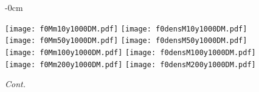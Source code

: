 \documentclass[universe,article,accept,moreauthors,pdftex]{Definitions/mdpi}
\begin{document}
\begin{figure}[H]\ContinuedFloat


\begin{adjustwidth}{-\extralength}{0cm}
\centering %

{\texttt{[image: f0Mm10y1000DM.pdf]}\vspace{3pt}
	  \texttt{[image: f0densM10y1000DM.pdf]}}\\\vspace{5pt}
{\texttt{[image: f0Mm50y1000DM.pdf]}\vspace{3pt}
	  \texttt{[image: f0densM50y1000DM.pdf]}}\\\vspace{5pt}
{\texttt{[image: f0Mm100y1000DM.pdf]}\vspace{3pt}
	  \texttt{[image: f0densM100y1000DM.pdf]}}\\\vspace{5pt}
{\texttt{[image: f0Mm200y1000DM.pdf]}\vspace{3pt}
	  \texttt{[image: f0densM200y1000DM.pdf]}}\\
\end{adjustwidth}
\caption{\emph{Cont.}}
\label{fig:f0Mdens1000DM}

\end{figure}
\end{document}
